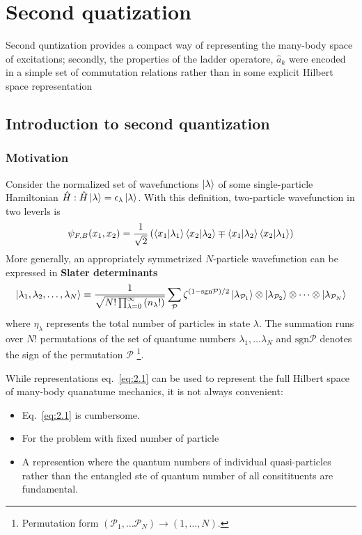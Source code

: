 \chapter{Second quatization}
Second quntization provides a compact way of representing the many-body space of excitations;
secondly, the properties of the ladder operatore, $\hat{a}_k$ were encoded in a simple set of commutation relations rather than in some explicit Hilbert space representation

\section{Introduction to second quantization}\label{sec:2.1}
\subsection{Motivation}
Consider the normalized set of wavefunctions $\ket{\lambda}$ of some single-particle Hamiltonian $\hat{H}: \hat{H}\ket{\lambda} = \epsilon_\lambda \ket{\lambda}$.
With this definition, two-particle wavefunction in two leverls is
\begin{equation}
\psi_{F,B}(x_1,x_2) = \frac{1}{\sqrt{2}} \left(\braket{x_1}{\lambda_1} \braket{x_2}{\lambda_2} \mp \braket{x_1}{\lambda_2} \braket{x_2}{\lambda_1} \right)
\end{equation}
More generally, an appropriately symmetrized $N$-particle wavefunction can be expressed in \textbf{Slater determinants}
\begin{equation}
    \ket{\lambda_1, \lambda_2,\dots, \lambda_N} \equiv \frac{1}{\sqrt{ N ! \prod^\infty_{\lambda=0}\left( n_\lambda ! \right)}} \sum_\mathcal{P} \zeta^{(1 - \mathrm{sgn} \mathcal{P})/2}  \ket{\lambda_{\mathcal{P}_1}} \otimes \ket{\lambda_{\mathcal{P}_2}} \otimes \dots \otimes \ket{\lambda_{\mathcal{P}_N}}
    \label{eq:2.1}
\end{equation}
where $\eta_\lambda$ represents the total number of particles in state $\lambda$.
The summation runs over $N!$ permutations of the set of quantume numbers ${\lambda_1,\dots \lambda_N}$ and $\mathrm{sgn}\mathcal{P}$ denotes the sign of the permutation $\mathcal{P}$ \footnote{ Permutation form $\left(\mathcal{P}_1,\dots \mathcal{P}_N \right) \to \left( 1,\dots, N\right)$.}.

While representations eq.~\eqref{eq:2.1} can be used to represent the full Hilbert space of many-body quanatume mechanics, it is not always convenient:
\begin{itemize}
    \item Eq.~\eqref{eq:2.1} is cumbersome.
    \item For the problem with fixed number of particle
    \item A represention where the quantum numbers of individual quasi-particles rather than the entangled ste of quantum number of all consitituents are fundamental.
\end{itemize}

